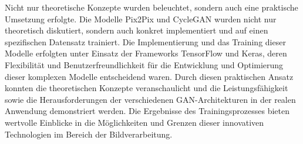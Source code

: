 Nicht nur theoretische Konzepte wurden beleuchtet, sondern auch eine praktische Umsetzung erfolgte. Die Modelle Pix2Pix und CycleGAN wurden nicht nur theoretisch diskutiert, sondern auch konkret implementiert und auf einen spezifischen Datensatz trainiert. Die Implementierung und das Training dieser Modelle erfolgten unter Einsatz der Frameworks TensorFlow und Keras, deren Flexibilität und Benutzerfreundlichkeit für die Entwicklung und Optimierung dieser komplexen Modelle entscheidend waren. Durch diesen praktischen Ansatz konnten die theoretischen Konzepte veranschaulicht und die Leistungsfähigkeit sowie die Herausforderungen der verschiedenen GAN-Architekturen in der realen Anwendung demonstriert werden. Die Ergebnisse des Trainingsprozesses bieten wertvolle Einblicke in die Möglichkeiten und Grenzen dieser innovativen Technologien im Bereich der Bildverarbeitung.